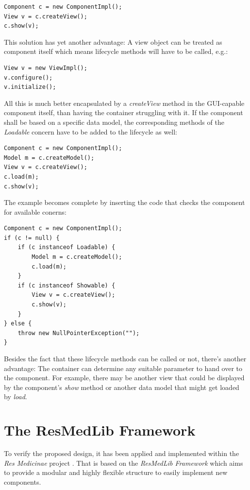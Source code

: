 \documentclass[a4paper,10pt]{llncs}
\begin{document}
\begin{verbatim}
Component c = new ComponentImpl();
View v = c.createView();
c.show(v);
\end{verbatim}

This solution has yet another advantage: A view object can be treated as
component itself which means lifecycle methods will have to be called, e.g.:

\begin{verbatim}
View v = new ViewImpl();
v.configure();
v.initialize();
\end{verbatim}

All this is much better encapsulated by a \emph{createView} method in the GUI-capable
component itself, than having the container struggling with it.
If the component shall be based on a specific data model, the corresponding
methods of the \emph{Loadable} concern have to be added to the lifecycle as well:

\begin{verbatim}
Component c = new ComponentImpl();
Model m = c.createModel();
View v = c.createView();
c.load(m);
c.show(v);
\end{verbatim}

The example becomes complete by inserting the code that checks the component
for available conerns:

\begin{verbatim}
Component c = new ComponentImpl();
if (c != null) {
    if (c instanceof Loadable) {
        Model m = c.createModel();
        c.load(m);
    }
    if (c instanceof Showable) {
        View v = c.createView();
        c.show(v);
    }
} else {
    throw new NullPointerException("");
}
\end{verbatim}

Besides the fact that these lifecycle methods can be called or not, there's another advantage:
The container can determine any suitable parameter to hand over to the component.
For example, there may be another view that could be displayed by the component's
\emph{show} method or another data model that might get loaded by \emph{load}.

%
%
\section{The ResMedLib Framework}

To verify the proposed design, it has been applied and implemented within the
\emph{Res Medicinae} project \cite{resmedicinae}. That is based on the \emph{ResMedLib Framework}
which aims to provide a modular and highly flexible structure to easily implement new components.
\end{document}
